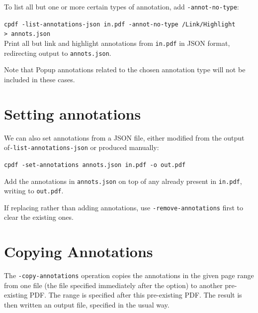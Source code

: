 \documentclass{book}
\begin{document}
\noindent To list all but one or more certain types of annotation, add \texttt{-annot-no-type}:

  \begin{framed}
    \noindent\small\verb!cpdf -list-annotations-json in.pdf -annot-no-type /Link/Highlight!\\
    \noindent\small\verb!> annots.json!\\
    
    \vspace{2.5mm}
    \noindent Print all but link and highlight annotations from \texttt{in.pdf} in JSON format, redirecting output to \texttt{annots.json}.
  \end{framed}

\noindent Note that Popup annotations related to the chosen annotation type will not be included in these cases.

\section{Setting annotations}

We can also set annotations from a JSON file, either modified from the output of\linebreak \texttt{-list-annotations-json} or produced manually:

  \begin{framed}
    \noindent\small\verb!cpdf -set-annotations annots.json in.pdf -o out.pdf !
    
    \vspace{2.5mm}
    \noindent Add the annotations in \texttt{annots.json} on top of any already present in \texttt{in.pdf}, writing to \texttt{out.pdf}.

  \end{framed}

\noindent If replacing rather than adding annotations, use \texttt{-remove-annotations} first to clear the existing ones.


  \section{Copying Annotations}
  The \texttt{-copy-annotations} operation copies the annotations in the given
page range from one file (the file specified immediately after the option) to
another pre-existing PDF. The range is specified after this pre-existing PDF.
The result is then written an output file, specified in the usual way.
\end{document}
